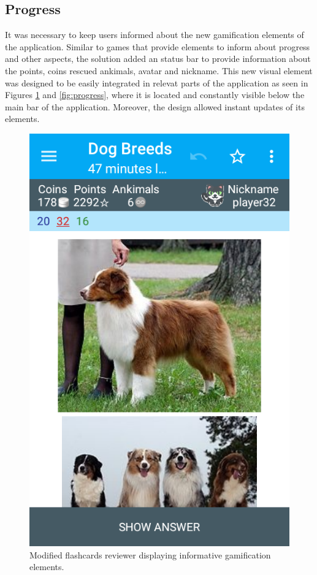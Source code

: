 \subsection{Progress}
It was necessary to keep users informed about the new gamification elements of the application. Similar to games that provide elements to inform about progress and other aspects, the solution added an status bar to provide information about the points, coins rescued ankimals, avatar and nickname. This new visual element was designed to be easily integrated in relevat parts of the application as seen in Figures \ref{fig:reviewer-modified} and \ref{fig:progress}, where it is located and constantly visible below the main bar of the application. Moreover, the design allowed instant updates of its elements.

\begin{figure}[htb]
    \vskip 5mm
        \begin{center}
            \includegraphics[scale=0.4]{./Figures/modified_reviewer.png}
            \caption{Modified flashcards reviewer displaying informative gamification elements.}
            \label{fig:reviewer-modified}
        \end{center}
    \vskip -5mm
\end{figure}

